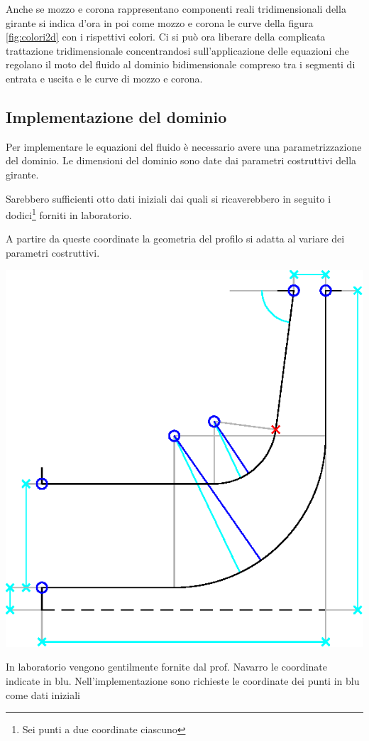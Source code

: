 \documentclass{tufte-handout}
\begin{document}
Anche se mozzo e corona rappresentano componenti reali tridimensionali della girante
si indica d'ora in poi come mozzo e corona le curve della figura \ref{fig:colori2d} 
con i rispettivi colori.
Ci si può ora liberare della complicata trattazione tridimensionale
concentrandosi sull'applicazione delle equazioni che regolano il moto del fluido
al dominio bidimensionale compreso tra i segmenti di entrata e uscita e le curve di mozzo
e corona.



\subsection{Implementazione del dominio}
Per implementare le equazioni del fluido è necessario avere una
parametrizzazione del dominio. Le dimensioni del dominio sono date dai parametri costruttivi
della girante.

Sarebbero sufficienti otto dati iniziali dai
quali si ricaverebbero in seguito i dodici\footnote{Sei punti a due coordinate ciascuno}
forniti in laboratorio.

A partire da queste coordinate la geometria del profilo si adatta
al variare dei parametri costruttivi.

\begin{marginfigure}%
  \includegraphics[width=\linewidth]{dimensioni.eps}
  \caption{In laboratorio vengono gentilmente fornite dal prof. Navarro le coordinate
    indicate in blu. Nell'implementazione sono richieste le coordinate dei punti in blu come dati iniziali}
  \label{fig:dimgirante}
\end{marginfigure}
\end{document}
